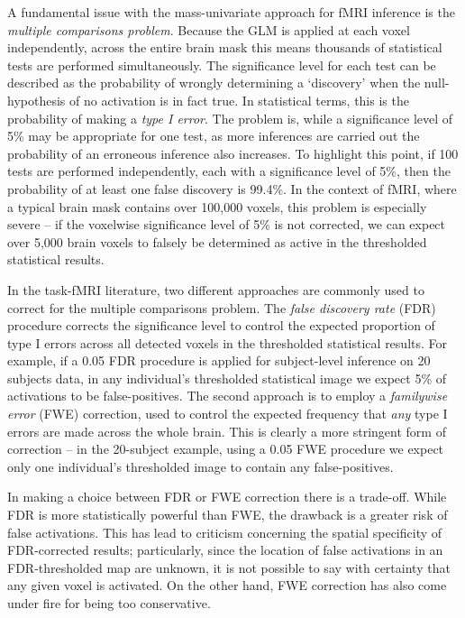 A fundamental issue with the mass-univariate approach for fMRI inference is the \textit{multiple comparisons problem}. Because the GLM is applied at each voxel independently, across the entire brain mask this means thousands of statistical tests are performed simultaneously. The significance level for each test can be described as the probability of wrongly determining a `discovery' when the null-hypothesis of no activation is in fact true. In statistical terms, this is the probability of making a \textit{type I error}. The problem is, while a significance level of 5\% may be appropriate for one test, as more inferences are carried out the probability of an erroneous inference also increases. To highlight this point, if 100 tests are performed independently, each with a significance level of 5\%, then the probability of at least one false discovery is 99.4\%. In the context of fMRI, where a typical brain mask contains over 100,000 voxels, this problem is especially severe -- if the voxelwise significance level of 5\% is not corrected, we can expect over 5,000 brain voxels to falsely be determined as active in the thresholded statistical results.

In the task-fMRI literature, two different approaches are commonly used to correct for the multiple comparisons problem. The \textit{false discovery rate} (FDR) procedure corrects the significance level to control the expected proportion of type I errors across all detected voxels in the thresholded statistical results. For example, if a 0.05 FDR procedure is applied for subject-level inference on 20 subjects data, in any individual's thresholded statistical image we expect 5\% of activations to be false-positives. The second approach is to employ a \textit{familywise error} (FWE) correction, used to control the expected frequency that \textit{any} type I errors are made across the whole brain. This is clearly a more stringent form of correction -- in the 20-subject example, using a 0.05 FWE procedure we expect only one individual's thresholded image to contain any false-positives. 

In making a choice between FDR or FWE correction there is a trade-off. While FDR is more statistically powerful than FWE, the drawback is a greater risk of false activations. This has lead to criticism concerning the spatial specificity of FDR-corrected results; particularly, since the location of false activations in an FDR-thresholded map are unknown, it is not possible to say with certainty that any given voxel is activated. On the other hand, FWE correction has also come under fire for being too conservative.

